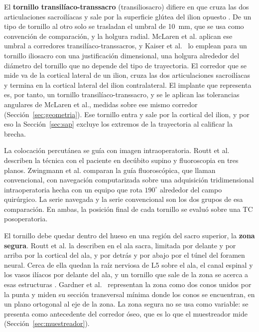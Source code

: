 El \textbf{tornillo transilíaco-transsacro} (transiliosacro) difiere en que cruza las dos articulaciones sacroilíacas y sale por la superficie glútea del ilion opuesto \cite{mclaren2021corridor,standring2020grays}. De un tipo de tornillo al otro solo se trasladan el umbral de 10~mm, que se usa como convención de comparación, y la holgura radial. McLaren et al. aplican ese umbral a corredores transilíaco-transsacros, y Kaiser et al.~\cite{kaiser2014dysmorphism} lo emplean para un tornillo iliosacro con una justificación dimensional, una holgura alrededor del diámetro del tornillo que no depende del tipo de trayectoria. El corredor que se mide va de la cortical lateral de un ilion, cruza las dos articulaciones sacroilíacas y termina en la cortical lateral del ilion contralateral. El implante que representa es, por tanto, un tornillo transilíaco-transsacro, y se le aplican las tolerancias angulares de McLaren et al., medidas sobre ese mismo corredor (Sección~\ref{sec:geometria}). Ese tornillo entra y sale por la cortical del ilion, y por eso la Sección~\ref{sec:sap} excluye los extremos de la trayectoria al calificar la brecha.

La colocación percutánea se guía con imagen intraoperatoria. Routt et al.~\cite{routt1997} describen la técnica con el paciente en decúbito supino y fluoroscopia en tres planos. Zwingmann et al. comparan la guía fluoroscópica, que llaman convencional, con navegación computarizada sobre una adquisición tridimensional intraoperatoria hecha con un equipo que rota $190^{\circ}$ alrededor del campo quirúrgico. La serie navegada y la serie convencional son los dos grupos de esa comparación. En ambas, la posición final de cada tornillo se evaluó sobre una TC posoperatoria.

El tornillo debe quedar dentro del hueso en una región del sacro superior, la \textbf{zona segura}. Routt et al. la describen en el ala sacra, limitada por delante y por arriba por la cortical del ala, y por detrás y por abajo por el túnel del foramen neural. Cerca de ella quedan la raíz nerviosa de L5 sobre el ala, el canal espinal y los vasos ilíacos por delante del ala, y un tornillo que sale de la zona se acerca a esas estructuras \cite{routt1997}. Gardner et al.~\cite{gardner2010safezones} representan la zona como dos conos unidos por la punta y miden su sección transversal mínima donde los conos se encuentran, en un plano ortogonal al eje de la zona. La zona segura no se usa como variable: se presenta como antecedente del corredor óseo, que es lo que el muestreador mide (Sección~\ref{sec:muestreador}).

